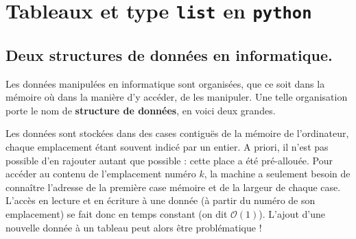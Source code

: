 %
%  
%
%  
%
%  
%
%  
%
%
%  
%
%
%  
%
%  
%
%  


\section{Tableaux et type \texttt{list} en \texttt{python}}

\subsection{Deux structures de données en informatique.}

Les données manipulées en informatique sont organisées, que ce soit dans la mémoire où dans la manière d'y accéder, de les manipuler. 
Une telle organisation porte le nom de \textbf{structure de données}, en voici deux grandes.  

\begin{defi}[Tableaux]
  Les données sont stockées dans des cases contiguës de la mémoire de l'ordinateur, chaque emplacement étant souvent indicé par un entier. 
    A priori, il n'est pas possible d'en rajouter autant que possible : cette place a été pré-allouée. 
    Pour accéder au contenu de l'emplacement numéro $k$, la machine a seulement besoin de connaître 
l'adresse de la première case mémoire et de la largeur de chaque case. 
    L'accès en lecture et en écriture à une donnée (à partir du numéro de son emplacement) se fait donc en temps constant (on dit $\mathcal{O}(1)$).
    L'ajout d'une nouvelle donnée à un tableau peut alors être problématique !
\end{defi}


